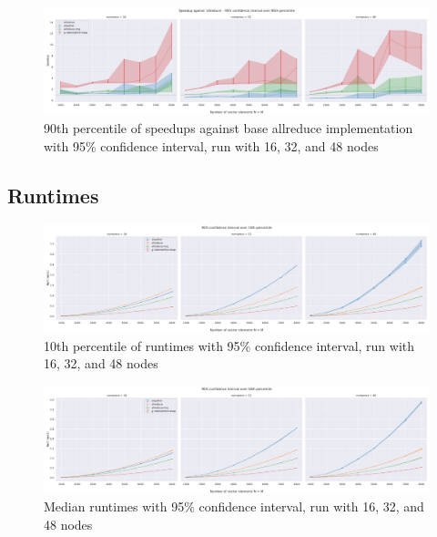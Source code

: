 \documentclass[letterpaper]{article}
\begin{document}
\begin{figure}[H]
    \centering
    \includegraphics[width=\columnwidth]{plots/speedup_plot_N_numprocs_16_32_48__baseline_allreduce_percentile_90_CI_0.95_with_errorbar.pdf}
    \caption{90th percentile of speedups against base allreduce implementation with 95\% confidence interval, run with 16, 32, and 48 nodes}
\end{figure}

\subsection{Runtimes}

\begin{figure}[H]
    \centering
    \includegraphics[width=\columnwidth]{plots/runtime_numprocs_16_32_48_N_percentile_10_CI_0.95_with_errorbar.pdf}
    \caption{10th percentile of runtimes with 95\% confidence interval, run with 16, 32, and 48 nodes}
\end{figure}

\begin{figure}[H]
    \centering
    \includegraphics[width=\columnwidth]{plots/runtime_numprocs_16_32_48_N_percentile_50_CI_0.95_with_errorbar.pdf}
    \caption{Median runtimes with 95\% confidence interval, run with 16, 32, and 48 nodes}
\end{figure}
\end{document}
